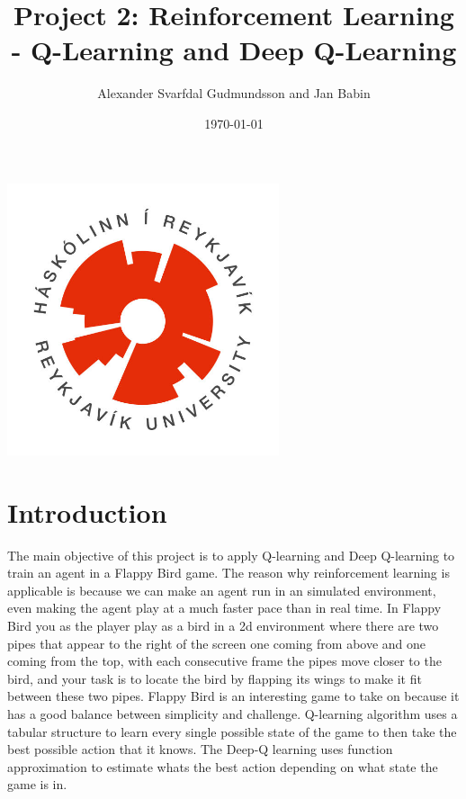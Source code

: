 \documentclass[a4paper,12pt]{article}
\title{Project 2: Reinforcement Learning - Q-Learning and Deep Q-Learning}
\author{Alexander Svarfdal Gudmundsson and Jan Babin}
\date{\today}
\begin{document}
\maketitle

\begin{center}  
    \includegraphics[width=0.6\textwidth]{HR_logo.jpg}
\end{center}

\clearpage

\tableofcontents

\clearpage

\section{Introduction}
The main objective of this project is to apply Q-learning and Deep Q-learning to train an agent in a Flappy Bird game. 
The reason why reinforcement learning is applicable is because we can make an agent run in an simulated environment, 
even making the agent play at a much faster pace than in real time. 
In Flappy Bird you as the player play as a bird in a 2d environment where there are two pipes that appear to the right of the screen one coming from above and one coming from the top, 
with each consecutive frame the pipes move closer to the bird, and your task is to locate the bird by flapping its wings to make it fit between these two pipes. 
Flappy Bird is an interesting game to take on because it has a good balance between simplicity and challenge. 
Q-learning algorithm uses a tabular structure to learn every single possible state of the game to then take the best possible action that it knows. 
The Deep-Q learning uses function approximation to estimate whats the best action depending on what state the game is in. 
\end{document}
